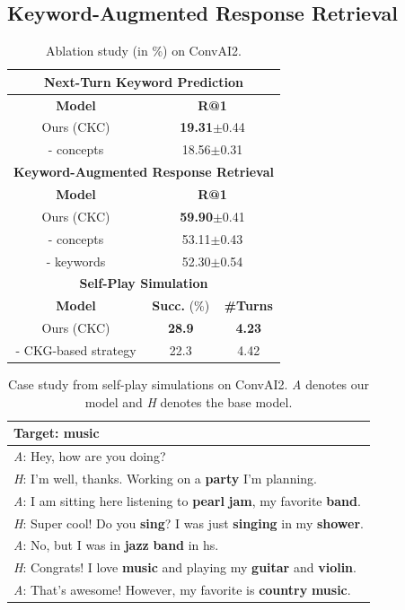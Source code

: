 \documentclass[letterpaper]{article} %
\begin{document}
\subsection{Keyword-Augmented Response Retrieval}
\label{sec: keyword-augmented response retrieval}
\begin{table}[!t]
\small
\centering
\begin{tabular}{c|cc}
\hline
\multicolumn{3}{c}{\textbf{Next-Turn Keyword Prediction}}\\
\hline
\textbf{Model}&\multicolumn{2}{c}{\textbf{R@1}}\\
Ours (CKC)&\multicolumn{2}{c}{\textbf{19.31}$\pm$0.44}\\
- concepts&\multicolumn{2}{c}{18.56$\pm$0.31}\\
\hline
\multicolumn{3}{c}{\textbf{Keyword-Augmented Response Retrieval}}\\
\hline
\textbf{Model}&\multicolumn{2}{c}{\textbf{R@1}}\\
Ours (CKC)&\multicolumn{2}{c}{\textbf{59.90}$\pm$0.41}\\
- concepts&\multicolumn{2}{c}{53.11$\pm$0.43}\\
- keywords&\multicolumn{2}{c}{52.30$\pm$0.54}\\
\hline
\multicolumn{3}{c}{\textbf{Self-Play Simulation}}\\
\hline
\textbf{Model}&\textbf{Succ.} (\%)&\textbf{\#Turns}\\
Ours (CKC)&\textbf{28.9}&\textbf{4.23}\\
- CKG-based strategy&22.3&4.42\\
\hline
\end{tabular}
\caption{Ablation study (in \%) on ConvAI2.}
\label{table: ablation study}
\end{table}
\begin{table}[!t]
\small
\centering
\begin{tabular}{l}
\hline
Target: \textbf{music}\\
\hline
\textit{A}: Hey, how are you doing?\\
\textit{H}: I'm well, thanks. Working on a \textbf{party} I'm planning.\\
\textit{A}: I am sitting here listening to \textbf{pearl} \textbf{jam}, my favorite \textbf{band}.\\
\textit{H}: Super cool! Do you \textbf{sing}? I was just \textbf{singing} in my \textbf{shower}.\\
\textit{A}: No, but I was in \textbf{jazz} \textbf{band} in hs.\\
\textit{H}: Congrats! I love \textbf{music} and playing my \textbf{guitar} and \textbf{violin}.\\
\textit{A}: That's awesome! However, my favorite is \textbf{country} \textbf{music}.\\
\hline
\end{tabular}
\caption{Case study from self-play simulations on ConvAI2. \textit{A} denotes our model and \textit{H} denotes the base model.}
\label{table: case study}
\end{table}
\end{document}
